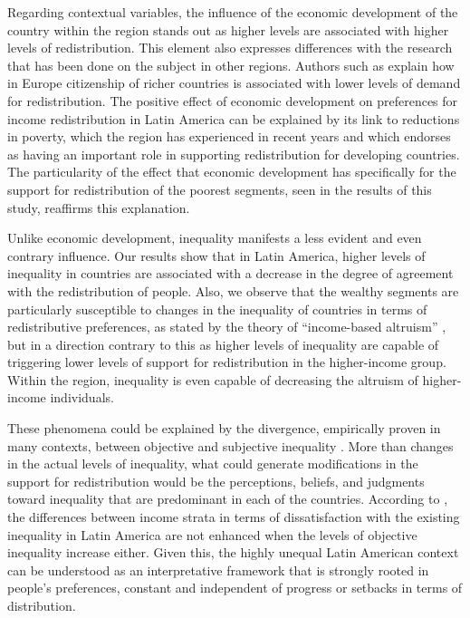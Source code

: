 \documentclass[utf8]{frontiersSCNS} %
\begin{document}
Regarding contextual variables, the influence of the economic development of the country within the region stands out as higher levels are associated with higher levels of redistribution. This element also expresses differences with the research that has been done on the subject in other regions. Authors such as \textcite{Schmidt-CatranEconomicinequalitypublic2016} explain how in Europe citizenship of richer countries is associated with lower levels of demand for redistribution. The positive effect of economic development on preferences for income redistribution in Latin America can be explained by its link to reductions in poverty, which the region has experienced in recent years \parencite{birdsall2013some, Dayton-Johnson2015} and which \textcite{wietzke2016kicking} endorses as having an important role in supporting redistribution for developing countries. The particularity of the effect that economic development has specifically for the support for redistribution of the poorest segments, seen in the results of this study, reaffirms this explanation.

Unlike economic development, inequality manifests a less evident and even contrary influence. Our results show that in Latin America, higher levels of inequality in countries are associated with a decrease in the degree of agreement with the redistribution of people. Also, we observe that the wealthy segments are particularly susceptible to changes in the inequality of countries in terms of redistributive preferences, as stated by the theory of “income-based altruism” \parencite{Dimick2016, Dimick2018}, but in a direction contrary to this as higher levels of inequality are capable of triggering lower levels of support for redistribution in the higher-income group. Within the region, inequality is even capable of decreasing the altruism of higher-income individuals.

These phenomena could be explained by the divergence, empirically proven in many contexts, between objective and subjective inequality \parencite{Castillolegitimacyeconomicinequality2010, Sachwehwelfarestateequality2010, mijs2019paradox}. More than changes in the actual levels of inequality, what could generate modifications in the support for redistribution would be the perceptions, beliefs, and judgments toward inequality \parencite{janmaat2013subjective} that are predominant in each of the countries. According to \textcite{CramerViewsEconomicInequality2011}, the differences between income strata in terms of dissatisfaction with the existing inequality in Latin America are not enhanced when the levels of objective inequality increase either. Given this, the highly unequal Latin American context can be understood as an interpretative framework that is strongly rooted in people’s preferences, constant and independent of progress or setbacks in terms of distribution.
\end{document}

